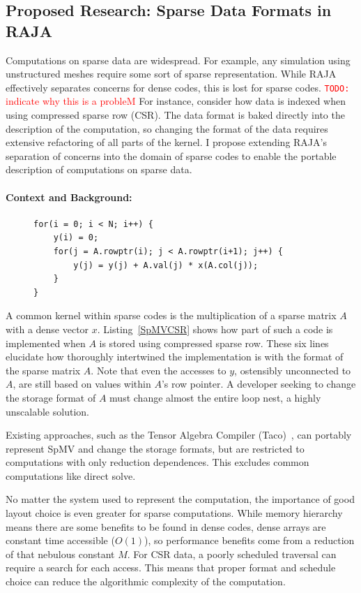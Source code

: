 \documentclass{article}
\newcommand{\todo}[1]{{\textcolor{red}{{\tt{TODO:}}\,\,#1 }}}
\begin{document}
\subsection{Proposed Research: Sparse Data Formats in RAJA}

Computations on sparse data are widespread. 
For example, any simulation using unstructured meshes require some sort of sparse representation.
While RAJA effectively separates concerns for dense codes, this is lost for sparse codes.
\todo{indicate why this is a probleM}
For instance, consider how data is indexed when using compressed sparse row (CSR). 
The data format is baked directly into the description of the computation, so changing the format of the data requires extensive refactoring of all parts of the kernel.
I propose extending RAJA's separation of concerns into the domain of sparse codes to enable the portable description of computations on sparse data.

\paragraph{Context and Background:}
\begin{figure}
\begin{lstlisting}[caption={CSR-stored sparse matrix vector multiplication},label={SpMVCSR}]
for(i = 0; i < N; i++) {
    y(i) = 0;
    for(j = A.rowptr(i); j < A.rowptr(i+1); j++) {
        y(j) = y(j) + A.val(j) * x(A.col(j));
    }
}
\end{lstlisting}
\end{figure}

A common kernel within sparse codes is the multiplication of a sparse matrix $A$ with a dense vector $x$.
Listing~\ref{SpMVCSR} shows how part of such a code is implemented when $A$ is stored using compressed sparse row.
These six lines elucidate how thoroughly intertwined the implementation is with the format of the sparse matrix $A$.
Note that even the accesses to $y$, ostensibly unconnected to $A$, are still based on values within $A$'s row pointer.
A developer seeking to change the storage format of $A$ must change almost the entire loop nest, a highly unscalable solution.

Existing approaches, such as the Tensor Algebra Compiler (Taco)~\cite{kjolstad2017tensor}, can portably represent SpMV and change the storage formats, but are restricted to computations with only reduction dependences.
This excludes common computations like direct solve.

No matter the system used to represent the computation, the importance of good layout choice is even greater for sparse computations.
While memory hierarchy means there are some benefits to be found in dense codes, dense arrays are constant time accessible ($O(1)$), so performance benefits come from a reduction of that nebulous constant $M$.
For CSR data, a poorly scheduled traversal can require a search for each access.
This means that proper format and schedule choice can reduce the algorithmic complexity of the computation.
\end{document}
